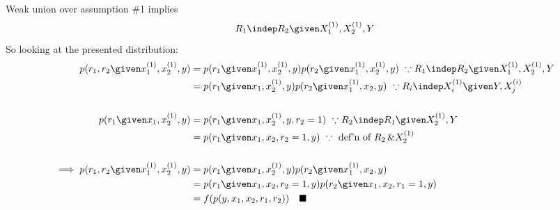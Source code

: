 Weak union over assumption \#1 implies 
$$
R_1 \indep R_2 \given X_1^{(1)}, X_2^{(1)}, Y
$$
So looking at the presented distribution:
\begin{align*}
    p(r_1, r_2 \given x_1^{(1)}, x_2^{(1)}, y) 
        &= p(r_1 \given x_1^{(1)}, x_2^{(1)}, y) p(r_2 \given x_1^{(1)}, x_2^{(1)}, y) ~\because R_1 \indep R_2 \given X_1^{(1)}, X_2^{(1)}, Y\\
        &= p(r_1 \given x_1, x_2^{(1)}, y) p(r_2 \given x_1^{(1)}, x_2, y) ~\because R_i \indep X_i^{(1)} \given Y, X_j^{(i)}\\\\
    p(r_1 \given x_1, x_2^{(1)}, y) 
        &= p(r_1 \given x_1, x_2^{(1)}, y, r_2 = 1) ~\because R_2 \indep R_1 \given X_2^{(1)}, Y\\
        &= p(r_1 \given x_1, x_2, r_2=1, y) ~\because ~\text{def'n of } R_2\,\& X_2^{(1)}\\\\
    \implies
    p(r_1, r_2 \given x_1^{(1)}, x_2^{(1)}, y)
        &= p(r_1 \given x_1, x_2^{(1)}, y) p(r_2 \given x_1^{(1)}, x_2, y)\\
        &= p(r_1 \given x_1, x_2, r_2=1, y) p(r_2 \given x_1, x_2, r_1=1, y)\\
        &= f(p(y, x_1, x_2, r_1, r_2)) ~~~\blacksquare
\end{align*}
